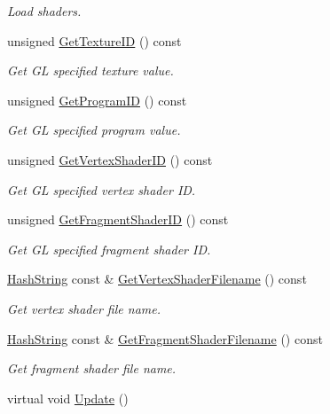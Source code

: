 \begin{DoxyCompactItemize}
\begin{DoxyCompactList}\small\item\em Load shaders. \end{DoxyCompactList}\item 
unsigned \hyperlink{classPCShaderSurface_addbb77f1a9d6db52e97f8d9a295096e0}{Get\+Texture\+ID} () const 
\begin{DoxyCompactList}\small\item\em Get GL specified texture value. \end{DoxyCompactList}\item 
unsigned \hyperlink{classPCShaderSurface_aa89277538add28b391e109d375a1e397}{Get\+Program\+ID} () const 
\begin{DoxyCompactList}\small\item\em Get GL specified program value. \end{DoxyCompactList}\item 
unsigned \hyperlink{classPCShaderSurface_a5aae126662630703a8e96a1bfeaa826f}{Get\+Vertex\+Shader\+ID} () const 
\begin{DoxyCompactList}\small\item\em Get GL specified vertex shader ID. \end{DoxyCompactList}\item 
unsigned \hyperlink{classPCShaderSurface_a75148953b9251933b8e1b92bbf1a4bbd}{Get\+Fragment\+Shader\+ID} () const 
\begin{DoxyCompactList}\small\item\em Get GL specified fragment shader ID. \end{DoxyCompactList}\item 
\hyperlink{classHashString}{Hash\+String} const \& \hyperlink{classPCShaderSurface_a76ddb07c2c1eaf278897ac9721af923f}{Get\+Vertex\+Shader\+Filename} () const 
\begin{DoxyCompactList}\small\item\em Get vertex shader file name. \end{DoxyCompactList}\item 
\hyperlink{classHashString}{Hash\+String} const \& \hyperlink{classPCShaderSurface_a4336504cd2ae509d3b4cc4668f72e8b5}{Get\+Fragment\+Shader\+Filename} () const 
\begin{DoxyCompactList}\small\item\em Get fragment shader file name. \end{DoxyCompactList}\item 
virtual void \hyperlink{classPCShaderSurface_a49251c5ad3d59fc484601e3a5df7cdb5}{Update} ()

\end{DoxyCompactItemize}
